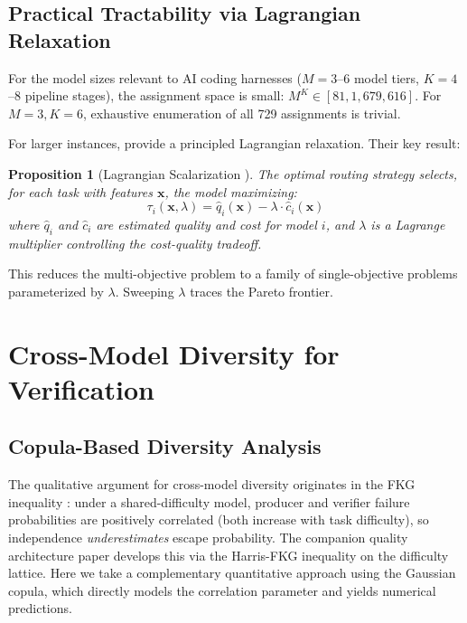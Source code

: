 \documentclass[11pt, a4paper, logo, copyright]{googledeepmind}
\newtheorem{proposition}{Proposition}[section]
\begin{document}
\subsection{Practical Tractability via Lagrangian Relaxation}

For the model sizes relevant to AI coding harnesses ($M = 3$--$6$ model tiers, $K = 4$--$8$ pipeline stages), the assignment space is small: $M^K \in [81, 1{,}679{,}616]$. For $M = 3, K = 6$, exhaustive enumeration of all 729 assignments is trivial.

For larger instances, \citet{dekoninck2025cascade} provide a principled Lagrangian relaxation. Their key result:

\begin{proposition}[Lagrangian Scalarization {\citep{dekoninck2025cascade}}]
\label{prop:lagrangian}
The optimal routing strategy selects, for each task with features $\mathbf{x}$, the model maximizing:
\begin{equation}
\label{eq:lagrangian}
\tau_i(\mathbf{x}, \lambda) = \hat{q}_i(\mathbf{x}) - \lambda \cdot \hat{c}_i(\mathbf{x})
\end{equation}
where $\hat{q}_i$ and $\hat{c}_i$ are estimated quality and cost for model $i$, and $\lambda$ is a Lagrange multiplier controlling the cost-quality tradeoff.
\end{proposition}

This reduces the multi-objective problem to a family of single-objective problems parameterized by $\lambda$. Sweeping $\lambda$ traces the Pareto frontier.


\section{Cross-Model Diversity for Verification}
\label{sec:diversity}

\subsection{Copula-Based Diversity Analysis}

The qualitative argument for cross-model diversity originates in the FKG inequality \citep{fkg1971}: under a shared-difficulty model, producer and verifier failure probabilities are positively correlated (both increase with task difficulty), so independence \emph{underestimates} escape probability. The companion quality architecture paper develops this via the Harris-FKG inequality on the difficulty lattice. Here we take a complementary quantitative approach using the Gaussian copula, which directly models the correlation parameter and yields numerical predictions.
\end{document}
